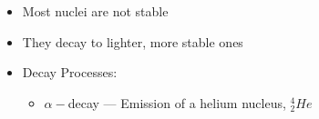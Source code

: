\begin{itemize}
    \begin{itemize}

      \item Most nuclei are not stable

      \item They decay to lighter, more stable ones

      \item Decay Processes:

        \begin{itemize}

          \item $\alpha-$decay — Emission of a helium nucleus, $^4_2He$

        \end{itemize}

    \end{itemize}

\end{itemize}



